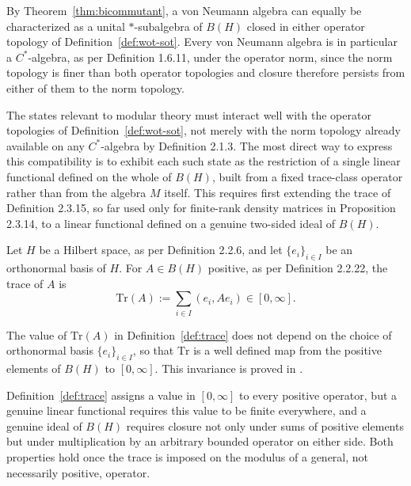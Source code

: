 \begin{remark}
	By Theorem~\ref{thm:bicommutant}, a von Neumann algebra can equally be
	characterized as a unital $*$-subalgebra of $B(H)$ closed in either
	operator topology of Definition~\ref{def:wot-sot}. Every von Neumann
	algebra is in particular a $C^*$-algebra, as per Definition 1.6.11,
	under the operator norm, since the norm topology is finer than both
	operator topologies and closure therefore persists from either of them
	to the norm topology.
\end{remark}

The states relevant to modular theory must interact well with the
operator topologies of Definition~\ref{def:wot-sot}, not merely with
the norm topology already available on any $C^*$-algebra by Definition
2.1.3. The most direct way to express this compatibility is to exhibit
each such state as the restriction of a single linear functional
defined on the whole of $B(H)$, built from a fixed trace-class operator
rather than from the algebra $M$ itself. This requires first extending
the trace of Definition 2.3.15, so far used only for finite-rank
density matrices in Proposition 2.3.14, to a linear functional defined
on a genuine two-sided ideal of $B(H)$.

\begin{definition}\label{def:trace}
	Let $H$ be a Hilbert space, as per Definition 2.2.6, and let
	$\{e_i\}_{i \in I}$ be an orthonormal basis of $H$. For $A \in B(H)$
	positive, as per Definition 2.2.22, the trace of $A$ is
	\[
	\mathrm{Tr}(A) := \sum_{i \in I} (e_i, A e_i) \in [0, \infty].
	\]
\end{definition}

\begin{remark}
	The value of $\mathrm{Tr}(A)$ in Definition~\ref{def:trace} does not
	depend on the choice of orthonormal basis $\{e_i\}_{i\in I}$, so that
	$\mathrm{Tr}$ is a well defined map from the positive elements of
	$B(H)$ to $[0,\infty]$. This invariance is proved in \cite[TODO:
	collocazione precisa]{TODO-traceclass}.
\end{remark}

Definition~\ref{def:trace} assigns a value in $[0,\infty]$ to every
positive operator, but a genuine linear functional requires this value
to be finite everywhere, and a genuine ideal of $B(H)$ requires closure
not only under sums of positive elements but under multiplication by an
arbitrary bounded operator on either side. Both properties hold once
the trace is imposed on the modulus of a general, not necessarily
positive, operator.

